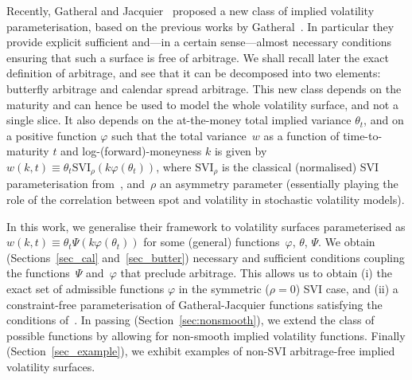 \documentclass{amsart}[11pt]
\numberwithin{equation}{section}
\theoremstyle{definition}
\begin{document}
Recently, Gatheral and Jacquier~\cite{gj} proposed a new class of implied volatility parameterisation, 
based on the previous works by Gatheral~\cite{Gatheral:2004}.
In particular they provide explicit sufficient and---in a certain sense---almost necessary conditions ensuring that such a surface is free of arbitrage.
We shall recall later the exact definition of arbitrage, and see that it can be decomposed into 
two elements: butterfly arbitrage and calendar spread arbitrage.
This new class depends on the maturity and can hence be used to model the whole volatility surface,
and not a single slice.
It also depends on the at-the-money total implied variance $\theta_t$,
and on a positive function $\varphi$ such that the total variance~$w$ as a function of time-to-maturity
$t$ and log-(forward)-moneyness $k$ is given by
$w(k,t)\equiv \theta_t \text{SVI}_{\rho}(k \varphi(\theta_t) )$,
where $\text{SVI}_{\rho}$ is the classical (normalised) SVI parameterisation from~\cite{gj},
and~$\rho$ an asymmetry parameter (essentially playing the role of the correlation between spot and volatility in stochastic volatility models).

In this work, we generalise their framework to volatility surfaces parameterised as
$w(k,t)\equiv \theta_t \Psi(k \varphi(\theta_t))$ for some (general) functions~$\varphi$, $\theta$, $\Psi$.
We obtain (Sections~\ref{sec_cal} and~\ref{sec_butter}) necessary and sufficient conditions coupling 
the functions~$\Psi$ and~$\varphi$ that preclude arbitrage.
This allows us to obtain
(i) the exact set of admissible functions $\varphi$ in the symmetric ($\rho=0$) SVI case, 
and (ii) a constraint-free parameterisation of Gatheral-Jacquier functions satisfying the conditions of~\cite{gj}.
In passing (Section~\ref{sec:nonsmooth}), we extend the class of possible functions by allowing for non-smooth implied volatility functions.
Finally (Section~\ref{sec_example}), we exhibit examples of non-SVI arbitrage-free implied volatility surfaces.
\end{document}
